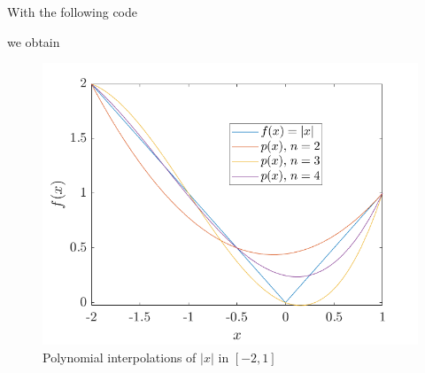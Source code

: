\begin{solution}
  With the following code
  
  we obtain
  \begin{figure}[H]
    \centering
    \includegraphics[scale=0.5]{graphics/plot-03-04.png}
    \caption{Polynomial interpolations of $|x|$ in $[-2, 1]$}
  \end{figure}
\end{solution}